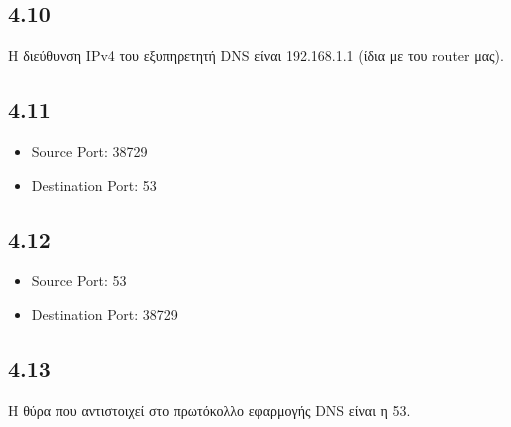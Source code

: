 		\subsection*{4.10}
			Η διεύθυνση IPv4 του εξυπηρετητή DNS είναι 192.168.1.1 (ίδια με του router μας).

		\subsection*{4.11}
			\begin{itemize}
				\item Source Port: 38729
				\item Destination Port: 53
			\end{itemize}

		\subsection*{4.12}
			\begin{itemize}
				\item Source Port: 53
				\item Destination Port: 38729
			\end{itemize}
		
		\subsection*{4.13}
			Η θύρα που αντιστοιχεί στο πρωτόκολλο εφαρμογής DNS είναι η 53.
